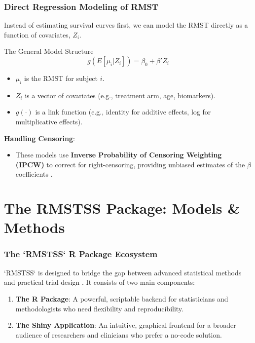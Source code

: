 \documentclass{beamer}
\begin{document}
\begin{frame}
\frametitle{Direct Regression Modeling of RMST}
Instead of estimating survival curves first, we can model the RMST directly as a function of covariates, $Z_i$.

\begin{block}{The General Model Structure}
$$g(E[\mu_i | Z_i]) = \beta_0 + \beta'Z_i$$
\end{block}
\begin{itemize}
    \item $\mu_i$ is the RMST for subject $i$.
    \item $Z_i$ is a vector of covariates (e.g., treatment arm, age, biomarkers).
    \item $g(\cdot)$ is a link function (e.g., identity for additive effects, log for multiplicative effects).
\end{itemize}
\vspace{1em}
\textbf{Handling Censoring}:
\begin{itemize}
    \item These models use \textbf{Inverse Probability of Censoring Weighting (IPCW)} to correct for right-censoring, providing unbiased estimates of the $\beta$ coefficients \cite{[1]}.
\end{itemize}
\end{frame}

\section{The RMSTSS Package: Models \& Methods}

\begin{frame}
\frametitle{The `RMSTSS` R Package Ecosystem}
`RMSTSS` is designed to bridge the gap between advanced statistical methods and practical trial design \cite{[1]}. It consists of two main components:
\begin{enumerate}
    \item \textbf{The R Package}: A powerful, scriptable backend for statisticians and methodologists who need flexibility and reproducibility.
    \item \textbf{The Shiny Application}: An intuitive, graphical frontend for a broader audience of researchers and clinicians who prefer a no-code solution.
\end{enumerate}
\end{frame}
\end{document}
